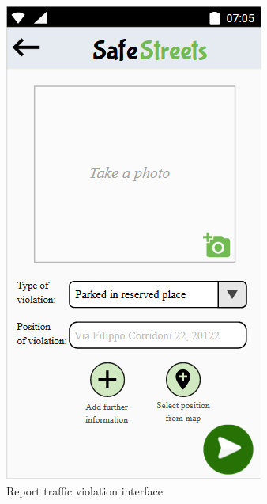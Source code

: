         \begin{figure}[h]
        \centering
        \includegraphics[scale=0.5]{Images/report_violation.png}
        \caption{Report traffic violation interface}
    \end{figure}
